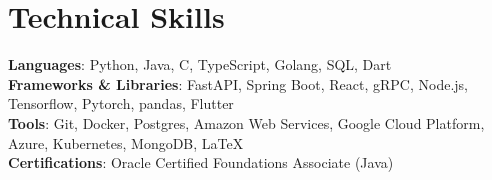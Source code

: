 \documentclass[letterpaper,11pt]{article}
\makeatletter
\newcommand{\resumeItem}[1]{
  \item\small{
    {#1 \vspace{-2pt}}
  }
}
\newcommand{\resumeProjectHeading}[2]{
    \item
    \begin{tabular*}{0.97\textwidth}{l@{\extracolsep{\fill}}r}
      \small#1 & #2 \\
    \end{tabular*}\vspace{-7pt}
}
\newcommand{\resumeSubHeadingListEnd}{\end{itemize}}
\newcommand{\resumeItemListStart}{\begin{itemize}}
\newcommand{\resumeItemListEnd}{\end{itemize}\vspace{-5pt}}
\makeatother
\begin{document}
%

\section{Technical Skills}
 \begin{itemize}[leftmargin=0.15in, label={}]
    \small{\item{
     \textbf{Languages}{: Python, Java, C, TypeScript, Golang, SQL, Dart} \\
     \textbf{Frameworks \& Libraries}{: FastAPI, Spring Boot, React, gRPC, Node.js, Tensorflow, Pytorch, pandas, Flutter} \\
     \textbf{Tools}{: Git, Docker, Postgres, Amazon Web Services, Google Cloud Platform, Azure, Kubernetes, MongoDB, \LaTeX} \\
     \textbf{Certifications}{: Oracle Certified Foundations Associate (Java)}
    }}
 \end{itemize}


\end{document}
